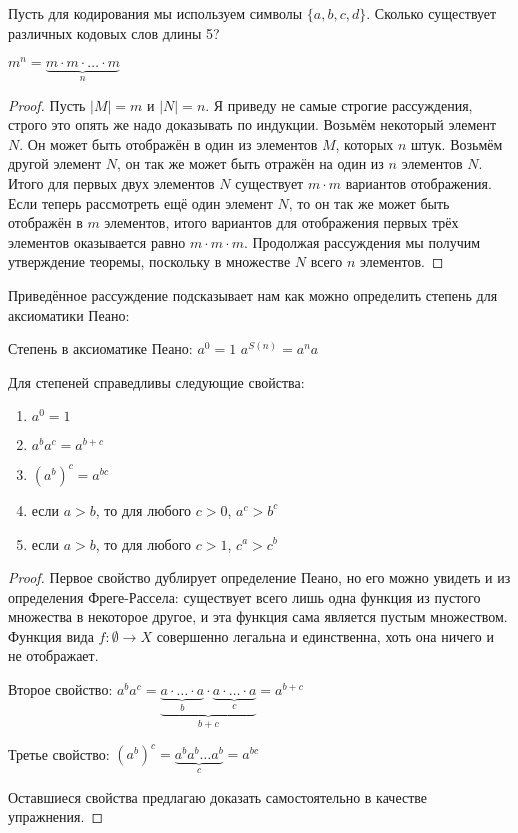 \begin{exercise}
Пусть для кодирования мы используем символы $\{a, b, c, d\}$. Сколько существует различных кодовых слов длины 5?
\end{exercise}

\begin{thm}
$m^n = \underbrace{m\cdot m \cdot \ldots \cdot m}_n$
\end{thm}
\begin{proof}
Пусть $|M| = m$ и $|N| = n$. Я приведу не самые строгие рассуждения, строго это опять же надо доказывать по индукции. Возьмём некоторый элемент $N$. Он может быть отображён в один из элементов $M$, которых $n$ штук. Возьмём другой элемент $N$, он так же может быть отражён на один из $n$ элементов $N$. Итого для первых двух элементов $N$ существует $m\cdot m$ вариантов отображения. Если теперь рассмотреть ещё один элемент $N$, то он так же может быть отображён в $m$ элементов, итого вариантов для отображения первых трёх элементов оказывается равно $m\cdot m\cdot m$. Продолжая рассуждения мы получим утверждение теоремы, поскольку в множестве $N$ всего $n$ элементов.
\end{proof}

Приведённое рассуждение подсказывает нам как можно определить степень для аксиоматики Пеано:

\begin{definition}
Степень в аксиоматике Пеано:\newline
$a^0 = 1$\newline
$a^{S(n)} = a^na$
\end{definition}

\begin{thm}
Для степеней справедливы следующие свойства:
\begin{enumerate}
\item $a^0 = 1$
\item $a^b a^c = a^{b+c}$
\item $(a^b)^c = a^{bc}$
\item если $a > b$, то для любого $c > 0$, $a^c > b^c$
\item если $a > b$, то для любого $c > 1$, $c^a > c^b$
\end{enumerate}
\end{thm}
\begin{proof}
Первое свойство дублирует определение Пеано, но его можно увидеть и из определения Фреге-Рассела: существует всего лишь одна функция из пустого множества в некоторое другое, и эта функция сама является пустым множеством. Функция вида $f:\emptyset\to X$ совершенно легальна и единственна, хоть она ничего и не отображает.

Второе свойство: $a^ba^c = \underbrace{\underbrace{a\cdot\ldots\cdot a}_b \cdot \underbrace{a \cdot\ldots \cdot a}_c}_{b+c} = a^{b+c}$

Третье свойство: $(a^b)^c = \underbrace{a^ba^b\ldots a^b}_c = a^{bc}$

Оставшиеся свойства предлагаю доказать самостоятельно в качестве упражнения.
\end{proof}

